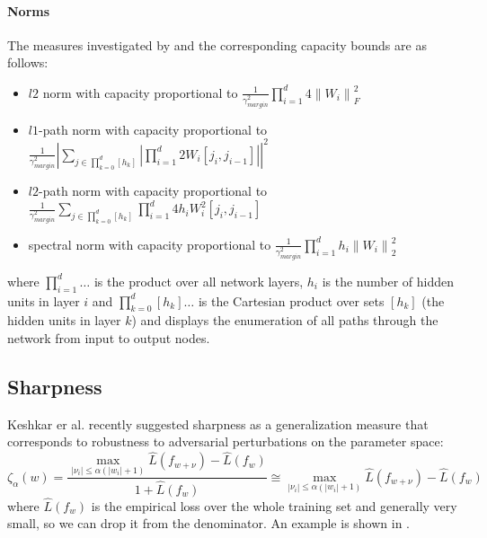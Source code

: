 \paragraph{Norms}
The measures investigated by \cite{neyshabur2017exploring} and the corresponding capacity bounds are as follows:
%
\begin{itemize}
	\item $l2$ norm with capacity proportional to $\frac{1}{\gamma_{margin}^2} \prod_{i=1}^{d} 4 \left\| W_i  \right\|_F^2$ \inlineeqno
	\item $l1$-path norm with capacity proportional to $\frac{1}{\gamma_{margin}^2} \left| \sum_{j \in \prod_{k=0}^d[h_k]}^{} \left| \prod_{i=1}^{d} 2 W_i [j_i, j_{i-1}] \right|\right|^2$ \inlineeqno
	\item $l2$-path norm with capacity proportional to $\frac{1}{\gamma_{margin}^2} \sum_{j \in \prod_{k=0}^d[h_k]}^{} \prod_{i=1}^{d} 4 h_i W_i^2 [j_i, j_{i-1}]$ \inlineeqno
	\item spectral norm with capacity proportional to $\frac{1}{\gamma_{margin}^2} \prod_{i=1}^{d} h_i \left\| W_i  \right\|_2^2$ \inlineeqno
\end{itemize}
where $\prod_{i=1}^{d}\dots$ is the product over all network layers, $h_i$ is the number of hidden units in layer $i$ and $\prod_{k=0}^d[h_k]\dots$ is the Cartesian product over sets $[h_k]$ (the hidden units in layer $k$) and displays the enumeration of all paths through the network from input to output nodes.
%
\subsection{Sharpness}
Keshkar er al. \cite{DBLP:journals/corr/KeskarMNST16} recently suggested sharpness as a generalization measure that corresponds to robustness to adversarial perturbations on the parameter space:
%
\begin{equation}
\zeta _\alpha (w) = \frac{\max_{\left| \nu_i \right| \le \alpha(\left| w_i  \right| + 1) }\hat{L}(f_{w + \nu}) - \hat{L}(f_w)}{1 + \hat{L}(f_w)} \cong \max_{\left| \nu_i \right| \le \alpha(\left| w_i  \right| + 1) }\hat{L}(f_{w + \nu}) - \hat{L}(f_w)
\end{equation}
% 
where $\hat{L}(f_{w})$ is the empirical loss over the whole training set and generally very small, so we can drop it from the denominator. An example is shown in .
